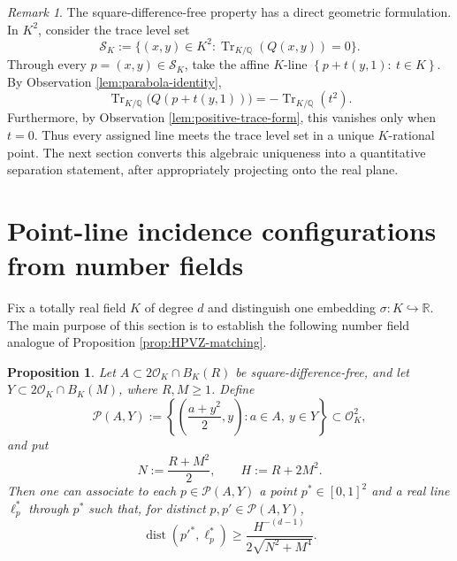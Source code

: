 \documentclass[11pt,reqno]{amsart}
\newtheorem{proposition}[proposition]{Proposition}
\theoremstyle{definition}
\theoremstyle{remark}
\newtheorem{remark}[remark]{Remark}
\newcommand{\R}{\mathbb{R}}
\newcommand{\Q}{\mathbb{Q}}
\newcommand{\OK}{\mathcal{O}_K}
\newcommand{\Tr}{\operatorname{Tr}}
\newcommand{\dist}{\operatorname{dist}}
\begin{document}
\begin{remark}
\label{rem:trace-paraboloid}
The square-difference-free property has a direct geometric formulation.
In $K^2$, consider the trace level set
\[
        \mathcal S_K
        :=\{(x,y)\in K^2:\Tr_{K/\Q}(Q(x,y))=0\}.
\]
Through every $p=(x,y)\in\mathcal S_K$, take the affine $K$-line $\left\{ p+t(y,1):\ t\in K\right\}$. By Observation \ref{lem:parabola-identity},
\[
        \Tr_{K/\Q}\bigl(Q(p+t(y,1))\bigr)
        =-\Tr_{K/\Q}(t^2).
\]
Furthermore, by Observation \ref{lem:positive-trace-form}, this vanishes only when $t=0$. Thus every assigned line meets the trace level set in a unique
$K$-rational point.  The next section converts this algebraic uniqueness into a quantitative separation statement, after appropriately projecting onto the real plane.
\end{remark}

\section{Point-line incidence configurations from number fields}
\label{sec:lift}

Fix a totally real field $K$ of degree $d$ and distinguish one embedding $\sigma:K\hookrightarrow\R$. The main purpose of this section is to establish the following number field analogue of Proposition \ref{prop:HPVZ-matching}.

\begin{proposition}
\label{prop:nf-lift}
Let $A\subset2\OK\cap B_K(R)$ be square-difference-free, and let
$Y\subset2\OK\cap B_K(M)$, where $R,M\ge1$. Define
\[
        \mathcal P(A,Y)
        :=
        \left\{
        \left(\frac{a+y^2}{2},y\right):
        a\in A,\ y\in Y
        \right\}
        \subset\OK^2,
\]
and put
\begin{equation}
\label{eq:N-H}
        N:=\frac{R+M^2}{2},
        \qquad
        H:=R+2M^2.
\end{equation}
Then one can associate to each $p\in\mathcal P(A,Y)$ a point
$p^*\in[0,1]^2$ and a real line $\ell_p^*$ through $p^*$ such that,
for distinct $p,p'\in\mathcal P(A,Y)$,
\[
        \dist(p'^*,\ell_p^*)
        \ge
        \frac{H^{-(d-1)}}{2\sqrt{N^2+M^4}}.
\]
\end{proposition}
\end{document}
